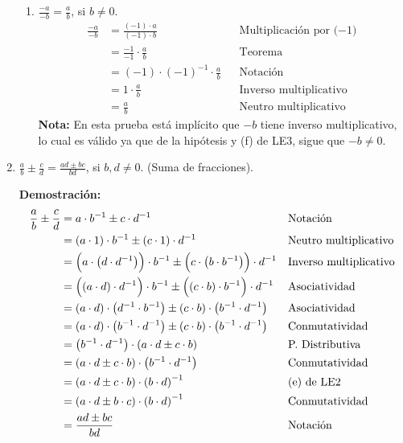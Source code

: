 \documentclass[11pt]{article}
\begin{document}
\begin{enumerate}[label=\alph*)]
\begin{enumerate}[label=\roman*)]
        \item $\frac{-a}{-b}=\frac{a}{b}$, si $b\neq 0$.
        \begin{align*}
            \frac{-a}{-b} &= \frac{(-1)\cdot a}{(-1)\cdot b} && \text{Multiplicación por ($-1$)}\\
            &=\frac{-1}{-1} \cdot \frac{a}{b} && \text{Teorema}\\
            &= (-1)\cdot (-1)^{-1}\cdot \frac{a}{b} && \text{Notación}\\
            &= 1\cdot \frac{a}{b} && \text{Inverso multiplicativo}\\
            &= \frac{a}{b} && \text{Neutro multiplicativo}
            \end{align*}
        \textbf{Nota:} En esta prueba está implícito que $-b$ tiene inverso multiplicativo, lo cual es válido ya que de la hipótesis y (f) de LE3, sigue que $-b\neq 0$.
    \end{enumerate} %

\pagebreak

    \item $\frac{a}{b} \pm \frac{c}{d} = \frac{ad \pm bc}{bd} $, si $b, d \neq 0$. (Suma de fracciones).
    
    \textbf{Demostración:}\begin{align*}
    \frac{a}{b} \pm \frac{c}{d}  &=	a \cdot b^{-1} \pm c \cdot d^{-1} && \text{Notación}\\
    &=	\left( a \cdot 1 \right)   \cdot b^{-1} \pm \left( c \cdot 1 \right) \cdot d^{-1} && \text{Neutro multiplicativo}\\
    &=	\Bigl( a \cdot  \left( d \cdot d^{-1} \right) \Bigr) \cdot b^{-1} \pm \Bigl( c \cdot  \left( b \cdot b^{-1}  \right)  \Bigr)  \cdot d^{-1} && \text{Inverso multiplicativo}\\
    &=	\Bigl(  \left( a \cdot d \right) \cdot d^{-1} \Bigr) \cdot b^{-1} \pm \Bigl(  \left( c \cdot b \right) \cdot b^{-1} \Bigr) \cdot d^{-1} && \text{Asociatividad}\\
    &=	\left( a \cdot d \right)  \cdot  \left( d^{-1} \cdot b^{-1}  \right) \pm \left( c \cdot b \right)  \cdot  \left( b^{-1} \cdot d^{-1}  \right) && \text{Asociatividad}\\
    &=	\left( a \cdot d \right)  \cdot  \left( b^{-1} \cdot d^{-1}  \right) \pm \left( c \cdot b \right)  \cdot  \left( b^{-1} \cdot d^{-1}  \right) && \text{Conmutatividad}\\
    &=	\left( b^{-1} \cdot d^{-1}  \right) \cdot \left( a \cdot d \pm c \cdot b \right) && \text{P. Distributiva}\\
    &=	\left( a \cdot d \pm c \cdot b \right) \cdot  \left( b^{-1} \cdot d^{-1} \right) && \text{Conmutatividad}\\
    &=	\left( a \cdot d \pm c \cdot b \right) \cdot  \left( b \cdot d \right)^{-1} && \text{(e) de LE2}\\
    &=	\left( a \cdot d \pm b \cdot c \right) \cdot \left( b \cdot d \right)^{-1} && \text{Conmutatividad}\\
    &=	\frac{ad \pm bc}{bd} && \text{Notación}
    \end{align*}


\end{enumerate}
\end{document}
